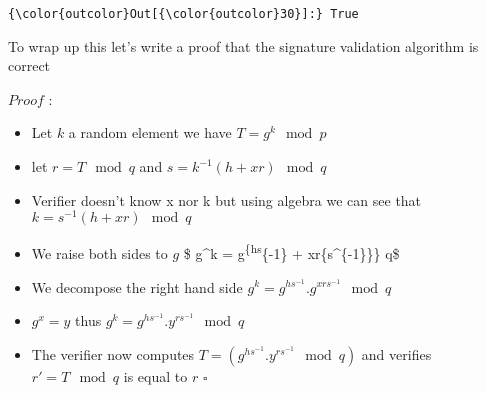 \documentclass[11pt]{article}
\begin{document}
\begin{Verbatim}[commandchars=\\\{\}]
{\color{outcolor}Out[{\color{outcolor}30}]:} True
\end{Verbatim}
            
    To wrap up this let's write a proof that the signature validation
algorithm is correct

\(Proof\) :

\begin{itemize}
\item
  Let \(k\) a random element we have \(T = g^k \mod p\)
\item
  let \(r = T \mod q\) and \(s = k^{-1} (h+xr) \mod q\)
\item
  Verifier doesn't know x nor k but using algebra we can see that
  \(k = s^{-1} (h+xr) \mod q\)
\item
  We raise both sides to \(g\) \$ g\^{}k = g\textsuperscript{\{hs}\{-1\}
  + xr\{s\^{}\{-1\}\}\} \mod q\$
\item
  We decompose the right hand side
  \(g^k = g^{hs^{-1}} . g^{xrs^{-1}} \mod q\)
\item
  \(g^x = y\) thus \(g^k = g^{hs^{-1}} . y^{rs^{-1}} \mod q\)
\item
  The verifier now computes \(T = (g^{hs^{-1}} . y^{rs^{-1}} \mod q)\)
  and verifies \(r' = T \mod q\) is equal to \(r\) \(\square\)
\end{itemize}


    
    
    
    
\end{document}
